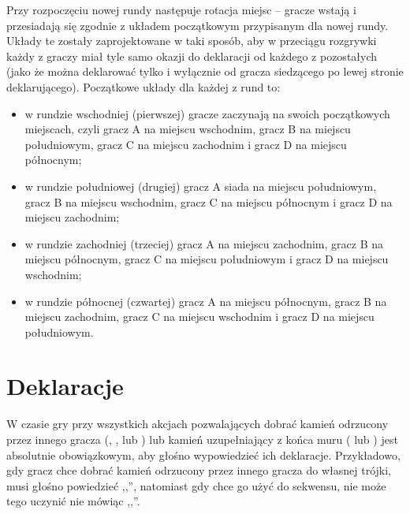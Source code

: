Przy rozpoczęciu nowej rundy następuje rotacja miejsc -- gracze wstają i
przesiadają się zgodnie z układem początkowym przypisanym dla nowej rundy.
Układy te zostały zaprojektowane w taki sposób, aby w przeciągu rozgrywki każdy
z graczy miał tyle samo okazji do deklaracji  od każdego z
pozostałych (jako że  można deklarować tylko i wyłącznie od gracza
siedzącego po lewej stronie deklarującego). Początkowe układy dla każdej z rund
to:
\begin{itemize}
  \item w rundzie wschodniej (pierwszej) gracze zaczynają na swoich początkowych
  miejscach, czyli gracz A na miejscu wschodnim, gracz B na miejscu
  południowym, gracz C na miejscu zachodnim i gracz D na miejscu północnym;
  \item w rundzie południowej (drugiej) gracz A siada na miejscu południowym,
  gracz B na miejscu wschodnim, gracz C na miejscu północnym i gracz D na
  miejscu zachodnim; 
  \item w rundzie zachodniej (trzeciej) gracz A na miejscu zachodnim, gracz B na
  miejscu północnym, gracz C na miejscu południowym i gracz D na miejscu
  wschodnim; 
  \item w rundzie północnej (czwartej) gracz A na miejscu północnym, gracz B na
  miejscu zachodnim, gracz C na miejscu wschodnim i gracz D na miejscu
  południowym.
\end{itemize}

% 


\section{Deklaracje}
\label{deklaracje}
W czasie gry przy wszystkich akcjach pozwalających dobrać kamień odrzucony przez
innego gracza (\peng, \dekchi, \hu lub \gang) lub kamień uzupełniający z końca
muru ( lub \hua) jest absolutnie obowiązkowym, aby głośno
wypowiedzieć ich deklaracje. Przykładowo, gdy gracz chce dobrać kamień odrzucony przez innego
gracza do własnej trójki, musi głośno powiedzieć ,,\peng'', natomiast gdy chce
go użyć do sekwensu, nie może tego uczynić nie mówiąc ,,\dekchi''. 

